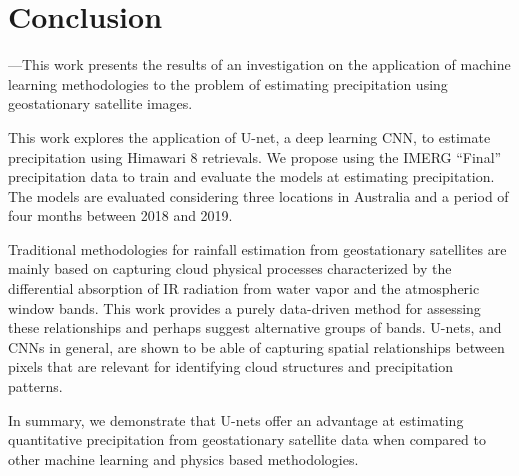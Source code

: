 \documentclass[3p,times]{elsarticle}
\begin{document}
\section{Conclusion}  %

---This work presents the results of an investigation on the application of machine learning methodologies to the problem of estimating precipitation using geostationary satellite images.


This work explores the application of U-net, a deep learning CNN, to estimate precipitation using Himawari 8 retrievals. We propose using the IMERG ``Final'' precipitation data to train and evaluate the models at estimating precipitation. The models are evaluated considering three locations in Australia and a period of four months between 2018 and 2019.

Traditional methodologies for rainfall estimation from geostationary satellites are mainly based on capturing cloud physical processes characterized by the differential absorption of IR radiation from water vapor and the atmospheric window bands. This work provides a purely data-driven method for assessing these relationships and perhaps suggest alternative groups of bands. U-nets, and CNNs in general, are shown to be able of capturing spatial relationships between pixels that are relevant for identifying cloud structures and precipitation patterns.

In summary, we demonstrate that U-nets offer an advantage at estimating quantitative precipitation from geostationary satellite data when compared to other machine learning and physics based methodologies.













\end{document}
